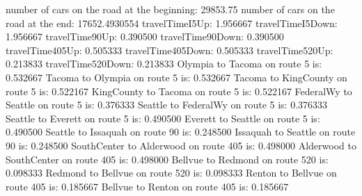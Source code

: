 number of cars on the road at the beginning:
29853.75
number of cars on the road at the end:
17652.4930554
travelTimeI5Up: 1.956667
travelTimeI5Down: 1.956667
travelTime90Up: 0.390500
travelTime90Down: 0.390500
travelTime405Up: 0.505333
travelTime405Down: 0.505333
travelTime520Up: 0.213833
travelTime520Down: 0.213833
Olympia to Tacoma on route 5 is: 0.532667
Tacoma to Olympia on route 5 is: 0.532667
Tacoma to KingCounty on route 5 is: 0.522167
KingCounty to Tacoma on route 5 is: 0.522167
FederalWy to Seattle on route 5 is: 0.376333
Seattle to FederalWy on route 5 is: 0.376333
Seattle to Everett on route 5 is: 0.490500
Everett to Seattle on route 5 is: 0.490500
Seattle to Issaquah on route 90 is: 0.248500
Issaquah to Seattle on route 90 is: 0.248500
SouthCenter to Alderwood on route 405 is: 0.498000
Alderwood to SouthCenter on route 405 is: 0.498000
Bellvue to Redmond on route 520 is: 0.098333
Redmond to Bellvue on route 520 is: 0.098333
Renton to Bellvue on route 405 is: 0.185667
Bellvue to Renton on route 405 is: 0.185667